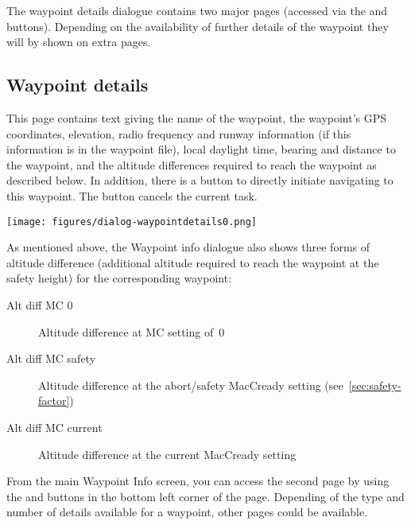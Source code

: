 The waypoint details dialogue contains two major pages (accessed via the
\bmenuw{$>$} and \bmenuw{$<$} buttons). Depending on the availability of further
details of the waypoint they will by shown on extra pages.

\subsection*{Waypoint details}\label{sec:waypointdetails}
This page contains text giving the name of the waypoint,
the waypoint's GPS coordinates, elevation, radio frequency and 
runway information (if this information is in the waypoint file), 
local daylight time, bearing and distance to the waypoint, and the altitude 
differences required 
to reach the waypoint as described below. In addition, there is a button 
 to directly initiate
navigating to this waypoint. The button cancels the current task. 
\begin{center}
\texttt{[image: figures/dialog-waypointdetails0.png]}
\end{center}

As mentioned above, the Waypoint info dialogue also shows three forms of altitude 
difference (additional
altitude required to reach the waypoint at the safety height) for
the corresponding waypoint:
\begin{description}
\item[Alt diff MC 0] Altitude difference at MC setting of~0
\item[Alt diff MC safety] Altitude difference at the abort/safety MacCready 
  setting (see~\ref{sec:safety-factor})
\item[Alt diff MC current] Altitude difference at the current MacCready setting
\end{description}

From the main Waypoint Info screen, you can access the second page by using the 
\bmenuw{$>$} and \bmenuw{$<$} buttons in the bottom left corner of the page.
Depending of the type and number of details available for a waypoint,
other pages could be available.

